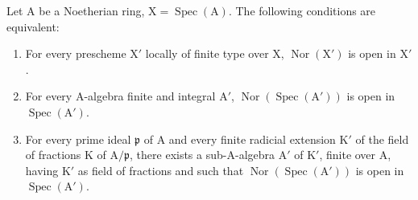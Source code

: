 \begin{proposition}[6.13.7]
\label{IV.6.13.7}
Let $\mathrm{A}$ be a Noetherian ring, $\mathrm{X}=\operatorname{Spec}(\mathrm{A})$. The following conditions are equivalent:
\begin{enumerate}[label=\emph{\alph*)}]
  \item For every prescheme $\mathrm{X}'$ locally of finite type over $\mathrm{X}$, $\operatorname{Nor}(\mathrm{X}')$ is open in $\mathrm{X}'$.
  \item For every $\mathrm{A}$-algebra finite and integral $\mathrm{A}'$, $\operatorname{Nor}(\operatorname{Spec}(\mathrm{A}'))$ is open in $\operatorname{Spec}(\mathrm{A}')$.
  \item For every prime ideal $\mathfrak{p}$ of $\mathrm{A}$ and every finite radicial extension $\mathrm{K}'$ of the field of fractions $\mathrm{K}$ of $\mathrm{A}/\mathfrak{p}$, there exists a
sub-$\mathrm{A}$-algebra $\mathrm{A}'$ of $\mathrm{K}'$, finite over $\mathrm{A}$, having $\mathrm{K}'$ as field of fractions and such that $\operatorname{Nor}(\operatorname{Spec}(\mathrm{A}'))$ is open in $\operatorname{Spec}(\mathrm{A}')$.
\end{enumerate}
\end{proposition}

